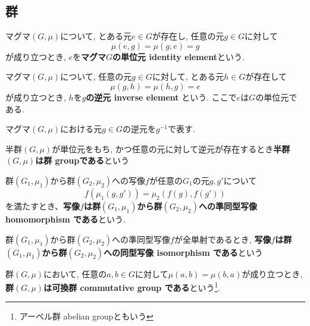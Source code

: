 \subsection{群}
\begin{Def}
マグマ$(G,\mu)$について, とある元$e\in G$が存在し, 任意の元$g\in G$に対して\[\mu(e,g)=\mu(g,e)=g\]が成り立つとき, $e$を{\bf マグマ$G$の単位元 identity element}という.
\end{Def}
\begin{Def}
マグマ$(G,\mu)$について, 任意の元$g\in G$に対して, とある元$h\in G$が存在して \[\mu(g,h)=\mu(h,g)=e\]が成り立つとき, $h$を{\bf $g$の逆元 inverse element }という.
ここで$e$は$G$の単位元である.
\end{Def}
\begin{Notation}
マグマ$(G,\mu)$における元$g\in G$の逆元を$g^{-1}$で表す.
\end{Notation}
\begin{Def}
半群$(G,\mu)$が単位元をもち, かつ任意の元に対して逆元が存在するとき{\bf 半群$(G,\mu)$は群 groupである}という
\end{Def}
\begin{Def}
群$(G_1,\mu_1)$から群$(G_2,\mu_2)$への写像$f$が任意の$G_1$の元$g, g'$について \[f(\mu_1(g,g')) = \mu_2(f(g),f(g'))\] を満たすとき、{\bf 写像$f$は群$(G_1,\mu_1)$から群$(G_2,\mu_2)$への準同型写像 homomorphism である}という.
\end{Def}
\begin{Def}
群$(G_1,\mu_1)$から群$(G_2,\mu_2)$への準同型写像$f$が全単射であるとき,
{\bf 写像$f$は群$(G_1,\mu_1)$から群$(G_2,\mu_2)$への同型写像 isomorphism である}という
\end{Def}
\begin{Def}
群$(G,\mu)$において,
任意の$a,b\in G$に対して$\mu(a,b)=\mu(b,a)$が成り立つとき,
{\bf 群$(G,\mu)$は可換群 commutative group である}という\footnote{アーベル群 abelian groupともいう}.
\end{Def}
\begin{comment}
\begin{Def}
位相空間$X$と自然数$n$に対して次の手続きで決定されるアーベル群$H_n(X)$を{\bf$n$次 ホモロジー群}と呼ぶ

...

\end{Def}
\end{comment}

